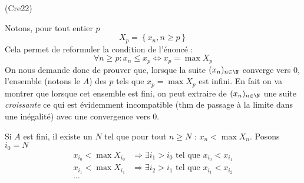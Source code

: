 \begin{tiny}(Cre22)\end{tiny} Notons, pour tout entier $p$
\begin{displaymath}
 X_p = \left\lbrace x_n , n\geq p \right\rbrace 
\end{displaymath}
Cela permet de reformuler la condition de l'énoncé :
\begin{displaymath}
 \forall n \geq p : x_n\leq x_p \Leftrightarrow x_p = \max X_p
\end{displaymath}
On nous demande donc de prouver que, lorsque la suite $(x_n)_{n\in \N}$ converge vers $0$, l'ensemble (notons le $A$) des $p$ tels que $x_p = \max X_p$ est infini.\newline
En fait on va montrer que lorsque cet ensemble est fini, on peut extraire de $(x_n)_{n\in \N}$ une suite \emph{croissante} ce qui est évidemment incompatible (thm de passage à la limite dans une inégalité) avec une convergence vers 0.

Si $A$ est fini, il existe un $N$ tel que pour tout $n\geq N$ : $x_n<\max X_n$. Posons $i_0=N$
\begin{align*}
 x_{i_0}<\max X_{i_0} &\Rightarrow \exists i_1 > i_0 \text{ tel que } x_{i_0}<x_{i_1} \\
 x_{i_1}<\max X_{i_1} &\Rightarrow \exists i_2 > i_1 \text{ tel que } x_{i_1}<x_{i_2} \\
\cdots
\end{align*}

